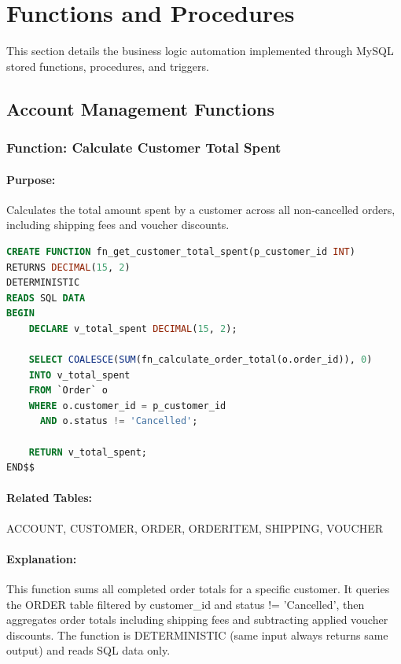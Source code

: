 \section{Functions and Procedures}

This section details the business logic automation implemented through MySQL stored functions, procedures, and triggers.

\subsection{Account Management Functions}

\subsubsection{Function: Calculate Customer Total Spent}

\paragraph{Purpose:} Calculates the total amount spent by a customer across all non-cancelled orders, including shipping fees and voucher discounts.

\begin{lstlisting}[language=SQL, caption=Function: fn\_get\_customer\_total\_spent, label=lst:fn_customer_spent]
CREATE FUNCTION fn_get_customer_total_spent(p_customer_id INT)
RETURNS DECIMAL(15, 2)
DETERMINISTIC
READS SQL DATA
BEGIN
    DECLARE v_total_spent DECIMAL(15, 2);
    
    SELECT COALESCE(SUM(fn_calculate_order_total(o.order_id)), 0)
    INTO v_total_spent
    FROM `Order` o
    WHERE o.customer_id = p_customer_id
      AND o.status != 'Cancelled';
    
    RETURN v_total_spent;
END$$
\end{lstlisting}

\paragraph{Related Tables:} ACCOUNT, CUSTOMER, ORDER, ORDERITEM, SHIPPING, VOUCHER

\paragraph{Explanation:}
This function sums all completed order totals for a specific customer. It queries the ORDER table filtered by customer\_id and status != 'Cancelled', then aggregates order totals including shipping fees and subtracting applied voucher discounts. The function is DETERMINISTIC (same input always returns same output) and reads SQL data only.

